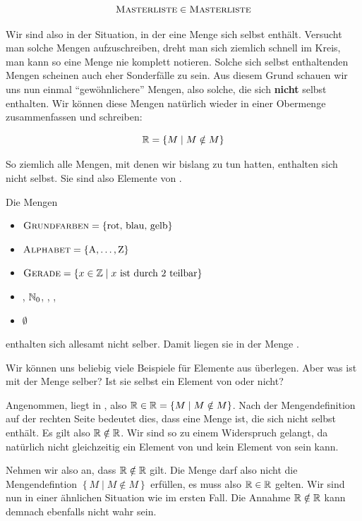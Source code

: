 \documentclass[../../main.tex]{subfiles}
\begin{document}
$$\textsc{Masterliste} \in \textsc{Masterliste}$$


Wir sind also in der Situation, in der eine Menge sich selbst enthält. Versucht man solche Mengen aufzuschreiben, dreht man sich ziemlich schnell im Kreis, man kann so eine Menge nie komplett notieren. Solche sich selbst enthaltenden Mengen scheinen auch eher Sonderfälle zu sein. Aus diesem Grund schauen wir uns nun einmal \enquote{gewöhnlichere} Mengen, also solche, die sich \textbf{nicht} selbst enthalten. Wir können diese Mengen natürlich wieder in einer Obermenge zusammenfassen und schreiben:

$$\mathbb{R} = \left\{ M \mid M \notin M \right\}$$

So ziemlich alle Mengen, mit denen wir bislang zu tun hatten, enthalten sich nicht selbst. Sie sind also Elemente von \R.

\begin{example}{}
	Die Mengen
	\begin{itemize}
		\item $\textsc{Grundfarben} = \left\{\text{rot, blau, gelb}\right\}$
		\item $\textsc{Alphabet} = \left\{\text{A},\ldots,\text{Z}\right\}$
		\item $\textsc{Gerade} = \left\{x \in \mathbb{Z} \mid x \text{ ist durch 2 teilbar}\right\}$
		\item \Natural, $\mathbb{N}_0$, \Integer, \Rational, \Real
		\item $\emptyset$
	\end{itemize}
	enthalten sich allesamt nicht selber. Damit liegen sie in der Menge \R.
\end{example}

Wir können uns beliebig viele Beispiele für Elemente aus \R überlegen. Aber was ist mit der Menge \R selber? Ist sie selbst ein Element von \R oder nicht?

Angenommen, \R liegt in \R, also $\mathbb{R} \in \mathbb{R} = \left\{ M \mid M \notin M \right\}$. Nach der Mengendefinition auf der 
rechten Seite bedeutet dies, dass \R eine Menge ist, die sich nicht selbst enthält. Es gilt also $\mathbb{R} \notin \mathbb{R}$. Wir sind 
so zu einem Widerspruch gelangt, da \R natürlich nicht gleichzeitig ein Element von \R und kein Element von \R sein kann.

Nehmen wir also an, dass $\mathbb{R} \notin \mathbb{R}$ gilt. Die Menge \R darf also nicht die Mengendefintion $\left\{ M \mid M \notin M \right\}$ erfüllen, es muss also $\mathbb{R} \in \mathbb{R}$ gelten. Wir sind nun in einer ähnlichen Situation wie im ersten Fall. Die Annahme $\mathbb{R} \notin \mathbb{R}$ kann demnach ebenfalls nicht wahr sein.
\end{document}
